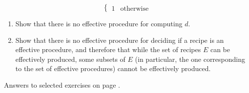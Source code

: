 {\begin{enumerate}
\begin{enumerate}
$$\begin{cases}
	1 & \text{otherwise}	
	\end{cases}$$ \begin{enumerate}
		\item Show that there is no effective procedure for computing $d$.  
		\item Show that there is no effective procedure for deciding if a recipe is an effective procedure, and therefore that while the set of recipes $E$ can be effectively produced, some subsets of $E$ (in particular, the one corresponding to the set of effective procedures) cannot be effectively produced.
			\end{enumerate} 
\end{enumerate}

Answers to selected exercises on page \pageref{ans5}.
\end{enumerate}

}






